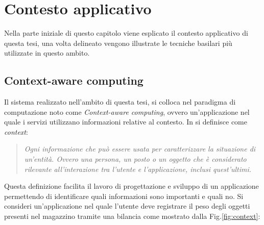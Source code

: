 \chapter{Contesto applicativo }
Nella parte iniziale di questo capitolo viene esplicato il contesto applicativo di questa tesi, una volta delineato vengono illustrate le tecniche basilari più utilizzate in questo ambito.

\section{Context-aware computing}
\label{context-aware}
Il sistema realizzato nell'ambito di questa tesi, si colloca nel paradigma di computazione noto come \textit{Context-aware computing}, ovvero un'applicazione nel quale i servizi utilizzano informazioni relative al contesto. In \cite{context} si definisce come \textit{context}:

\begin{quotation}
\textit{Ogni informazione che può essere usata per caratterizzare la situazione di un'entità. Ovvero una persona, un posto o un oggetto che è considerato rilevante all'interazione tra l'utente e l'applicazione, inclusi quest'ultimi.}
\end{quotation}

Questa definizione facilita il lavoro di progettazione e sviluppo di un applicazione permettendo di identificare quali informazioni sono importanti e quali no.
Si consideri un'applicazione nel quale l'utente deve registrare il peso degli oggetti presenti nel magazzino tramite una bilancia come mostrato dalla Fig.\ref{fig:context}:

